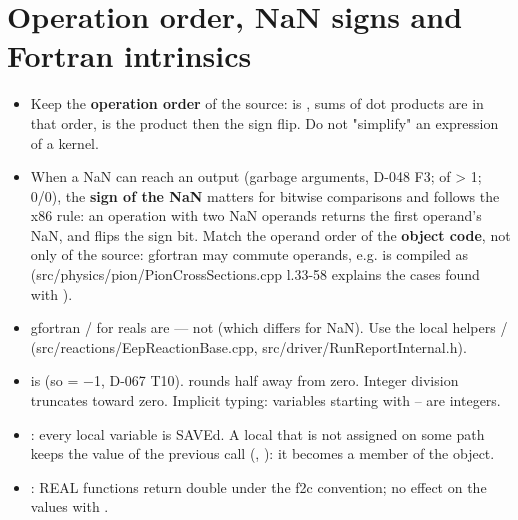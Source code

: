 \section{\texorpdfstring{Operation order, NaN signs and Fortran intrinsics}{Operation order, NaN signs and Fortran intrinsics}}\label{translation_report-04u5fnumerics:44-operation-order-nan-signs-and-fortran-intrinsics}
\begin{itemize}
\item Keep the \textbf{operation order} of the source:  is , sums of dot products are  in that order,
 is the product then the sign flip. Do not "simplify" an expression of a kernel.
\item When a NaN can reach an output (garbage arguments, D-048 F3;  of > 1; 0/0), the \textbf{sign of the NaN} matters for
bitwise comparisons and follows the x86 rule: an operation with two NaN operands returns the first operand's NaN, and
 flips the sign bit. Match the operand order of the \textbf{object code}, not only of the source: gfortran may commute
operands, e.g.  is compiled as  (src/\allowbreak{}physics/\allowbreak{}pion/\allowbreak{}PionCrossSections.\allowbreak{}cpp
l.33-58 explains the cases found with ).
\item gfortran  /  for reals are  — not  (which differs for NaN). Use
the local helpers  /  (src/\allowbreak{}reactions/\allowbreak{}EepReactionBase.\allowbreak{}cpp,\allowbreak{} src/\allowbreak{}driver/\allowbreak{}RunReportInternal.\allowbreak{}h).
\item {} is  (so  = −1, D-067 T10).  rounds half away from zero.
Integer division truncates toward zero. Implicit typing: variables starting with – are integers.
\item {}: every local variable is SAVEd. A local that is not assigned on some path keeps the value of the
previous call (, ): it becomes a member of the object.
\item {}: REAL functions return double under the f2c convention; no effect on the values with .
\end{itemize}
